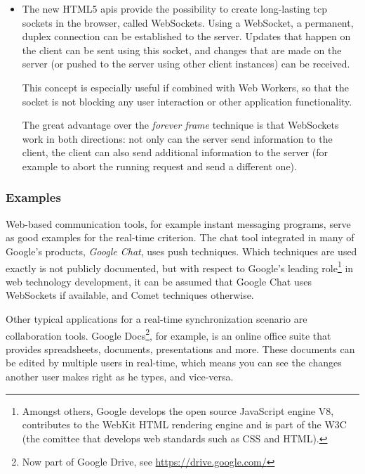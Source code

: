 \begin{itemize}
	\item The new HTML5 \acp{api} provide the possibility to create long-lasting \ac{tcp} sockets in the browser, called WebSockets. Using a WebSocket, a permanent, duplex connection can be established to the server. Updates that happen on the client can be sent using this socket, and changes that are made on the server (or pushed to the server using other client instances) can be received.

	This concept is especially useful if combined with Web Workers, so that the socket is not blocking any user interaction or other application functionality.

	The great advantage over the \emph{forever frame} technique is that WebSockets work in both directions: not only can the server send information to the client, the client can also send additional information to the server (for example to abort the running request and send a different one).
\end{itemize}

\subsubsection{Examples}
Web-based communication tools, for example instant messaging programs, serve as good examples for the real-time criterion. The chat tool integrated in many of Google's products, \emph{Google Chat}, uses push techniques. Which techniques are used exactly is not publicly documented, but with respect to Google's leading role\footnote{Amongst others, Google develops the open source JavaScript engine V8, contributes to the WebKit HTML rendering engine and is part of the W3C (the comittee that develops web standards such as CSS and HTML).} in web technology development, it can be assumed that Google Chat uses WebSockets if available, and Comet techniques otherwise.

Other typical applications for a real-time synchronization scenario are collaboration tools. Google Docs\footnote{Now part of Google Drive, see \url{https://drive.google.com/}}, for example, is an online office suite that provides spreadsheets, documents, presentations and more. These documents can be edited by multiple users in real-time, which means you can see the changes another user makes right as he types, and vice-versa.


